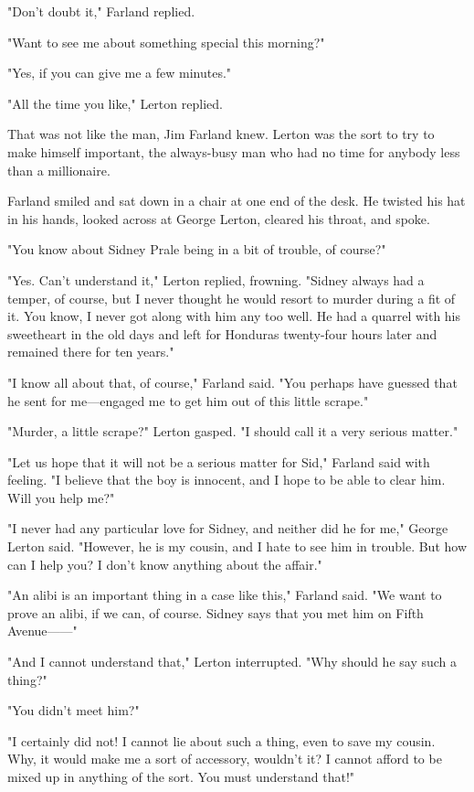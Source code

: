 \documentclass{novel}
\begin{document}
"Don't doubt it," Farland replied.

"Want to see me about something special this morning?"

"Yes, if you can give me a few minutes."

"All the time you like," Lerton replied.

That was not like the man, Jim Farland knew. Lerton was the sort to try to make himself important, the always-busy man who had no time for anybody less than a millionaire.

Farland smiled and sat down in a chair at one end of the desk. He twisted his hat in his hands, looked across at George Lerton, cleared his throat, and spoke.

"You know about Sidney Prale being in a bit of trouble, of course?"

"Yes. Can't understand it," Lerton replied, frowning. "Sidney always had a temper, of course, but I never thought he would resort to murder during a fit of it. You know, I never got along with him any too well. He had a quarrel with his sweetheart in the old days and left for Honduras twenty-four hours later and remained there for ten years."

"I know all about that, of course," Farland said. "You perhaps have guessed that he sent for me---engaged me to get him out of this little scrape."

"Murder, a little scrape?" Lerton gasped. "I should call it a very serious matter."

"Let us hope that it will not be a serious matter for Sid," Farland said with feeling. "I believe that the boy is innocent, and I hope to be able to clear him. Will you help me?"

"I never had any particular love for Sidney, and neither did he for me," George Lerton said. "However, he is my cousin, and I hate to see him in trouble. But how can I help you? I don't know anything about the affair."

"An alibi is an important thing in a case like this," Farland said. "We want to prove an alibi, if we can, of course. Sidney says that you met him on Fifth Avenue------"

"And I cannot understand that," Lerton interrupted. "Why should he say such a thing?"

"You didn't meet him?"

"I certainly did not! I cannot lie about such a thing, even to save my cousin. Why, it would make me a sort of accessory, wouldn't it? I cannot afford to be mixed up in anything of the sort. You must understand that!"
\end{document}
